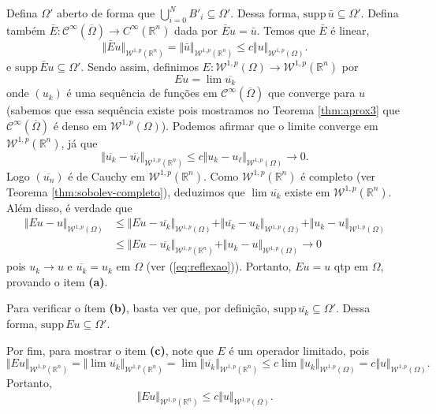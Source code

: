 \documentclass[a4paper, 11pt]{book}
\theoremstyle{definition}
\newcommand{\bR}{\mathbb{R}}
\newcommand{\cC}{\mathcal{C}}
\newcommand{\cW}{\mathcal{W}}
\newcommand{\supp}{\mathrm{supp}\,}
\begin{document}
\begin{prf}
    Defina $\Omega'$ aberto de forma que $\bigcup_{i=0}^N B'_i \subseteq \Omega'$.
    Dessa forma, $\supp \bar u \subseteq \Omega'$.
    Defina também $\bar E: \cC^\infty(\overline\Omega) \to C^\infty(\bR^n)$ dada por $\bar E u = \bar u$.
    Temos que $\bar E$ é linear,
    \[
        \Vert \bar E u \Vert_{\cW^{1,p}(\bR^n)} = \Vert \bar u \Vert_{\cW^{1,p}(\bR^n)} \leqslant c \Vert u \Vert_{\cW^{1,p}(\Omega)}.
    \]
    e $\supp \bar E u \subseteq \Omega'.$
    Sendo assim, definimos $E : \cW^{1,p}(\Omega) \to \cW^{1,p}(\bR^n)$ por
    \[
        Eu = \lim \overline{u_k}
    \]
    onde $(u_k)$ é uma sequência de funções em $\cC^\infty(\overline\Omega)$ que converge para $u$ (sabemos que essa sequência existe pois mostramos no Teorema \ref{thm:aprox3} que $\cC^\infty(\overline\Omega)$ é denso em $\cW^{1,p}(\Omega)$).
    Podemos afirmar que o limite converge em $\cW^{1,p}(\bR^n)$, já que
    \[
        \Vert \overline{u_k} - \overline{u_\ell} \Vert_{\cW^{1,p}(\bR^n)} \leqslant c \Vert u_k - u_\ell \Vert_{\cW^{1,p}(\Omega)} \to 0.
    \]
    Logo $(\overline{u_n})$ é de Cauchy em $\cW^{1,p}(\bR^n)$.
    Como $\cW^{1,p}(\bR^n)$ é completo (ver Teorema \ref{thm:sobolev-completo}), deduzimos que $\lim \overline{u_k}$ existe em $\cW^{1,p}(\bR^n)$.
    Além disso, é verdade que
    \[
        \begin{aligned}
            \Vert Eu - u \Vert_{\cW^{1,p}(\Omega)} &\leqslant \Vert Eu - \overline{u_k} \Vert_{\cW^{1,p}(\Omega)} + \Vert \overline{u_k} - u_k \Vert_{\cW^{1,p}(\Omega)} + \Vert u_k - u\Vert_{\cW^{1,p}(\Omega)}\\
            &\leqslant \Vert Eu - \overline{u_k} \Vert_{\cW^{1,p}(\bR^n)} + \Vert u_k - u \Vert_{\cW^{1,p}(\Omega)} \to 0
        \end{aligned}
    \]
    pois $u_k \to u$ e $\overline{u_k} = u_k$ em $\Omega$ (ver (\ref{eq:reflexao})).
    Portanto, $Eu = u$ qtp em $\Omega$, provando o item \textbf{(a)}.

    Para verificar o ítem \textbf{(b)}, basta ver que, por definição, $\supp \overline{u_k} \subseteq \Omega'$.
    Dessa forma, $\supp Eu \subseteq \Omega'$.

    Por fim, para mostrar o item \textbf{(c)}, note que $E$ é um operador limitado, pois
    \[
        \Vert Eu \Vert_{\cW^{1,p}(\bR^n)} = \Vert \lim \overline{u_k} \Vert_{\cW^{1,p}(\bR^n)} = \lim \Vert \overline{u_k} \Vert_{\cW^{1,p}(\bR^n)} \leqslant c \lim \Vert u_k \Vert_{\cW^{1,p}(\Omega)} = c \Vert u \Vert_{\cW^{1,p}(\Omega)}.
    \]
    Portanto,
    \[
        \Vert Eu \Vert_{\cW^{1,p}(\bR^n)} \leqslant c \Vert u \Vert_{\cW^{1,p}(\Omega)}.
    \]
\end{prf}
\end{document}
